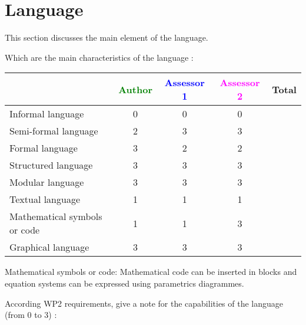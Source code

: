 \section{Language}
This section discusses the main element of the language.

Which are the main characteristics of the language :

\begin{tabular}{|l | c | c | c | c|}
\hline
& \textcolor{green}{Author} & \textcolor{blue}{Assessor 1} & \textcolor{magenta}{Assessor 2} & Total \\
\hline 
Informal language & 0 & 0 & 0 &  \\
\hline 
Semi-formal language & 2 & 3 & 3 &  \\
\hline
Formal language & 3 & 2 & 2 &  \\
\hline
Structured language &3 & 3 & 3 & \\
\hline
Modular language &3 & 3 & 3 & \\
\hline
Textual language & 1 & 1 & 1 & \\
\hline
Mathematical symbols or code & 1 & 1 & 3 & \\
\hline
Graphical language & 3 & 3 & 3 & \\
\hline
\end{tabular}
\begin{assessor2}
Mathematical symbols or code: Mathematical code can be inserted in blocks and equation systems can be expressed using parametrics diagrammes.
\end{assessor2}



According WP2 requirements, give a note for the capabilities of the language (from 0 to 3) :

